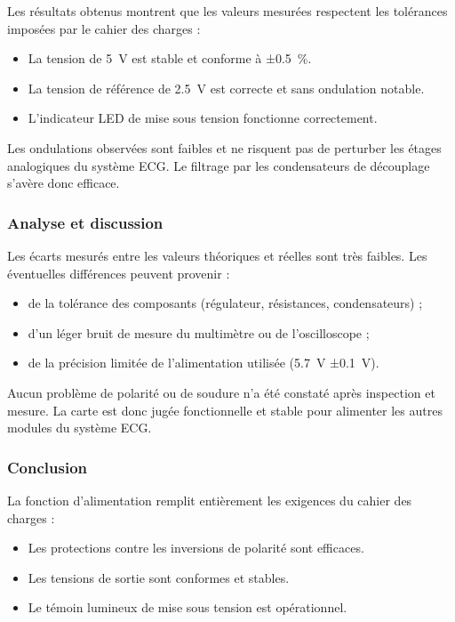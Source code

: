 \documentclass{article}
\begin{document}
Les résultats obtenus montrent que les valeurs mesurées respectent les tolérances imposées par le cahier des charges :
\begin{itemize}
    \item La tension de 5~V est stable et conforme à ±0.5~\%.
    \item La tension de référence de 2.5~V est correcte et sans ondulation notable.
    \item L’indicateur LED de mise sous tension fonctionne correctement.
\end{itemize}

Les ondulations observées sont faibles et ne risquent pas de perturber les étages analogiques du système ECG.  
Le filtrage par les condensateurs de découplage s’avère donc efficace.



\subsubsection{Analyse et discussion}

Les écarts mesurés entre les valeurs théoriques et réelles sont très faibles.  
Les éventuelles différences peuvent provenir :
\begin{itemize}
    \item de la tolérance des composants (régulateur, résistances, condensateurs) ;
    \item d’un léger bruit de mesure du multimètre ou de l’oscilloscope ;
    \item de la précision limitée de l’alimentation utilisée (5.7~V ±0.1~V).
\end{itemize}

Aucun problème de polarité ou de soudure n’a été constaté après inspection et mesure.  
La carte est donc jugée fonctionnelle et stable pour alimenter les autres modules du système ECG.

\subsubsection{Conclusion}

La fonction d’alimentation remplit entièrement les exigences du cahier des charges :
\begin{itemize}
    \item Les protections contre les inversions de polarité sont efficaces.
    \item Les tensions de sortie sont conformes et stables.
    \item Le témoin lumineux de mise sous tension est opérationnel.
\end{itemize}
\end{document}
